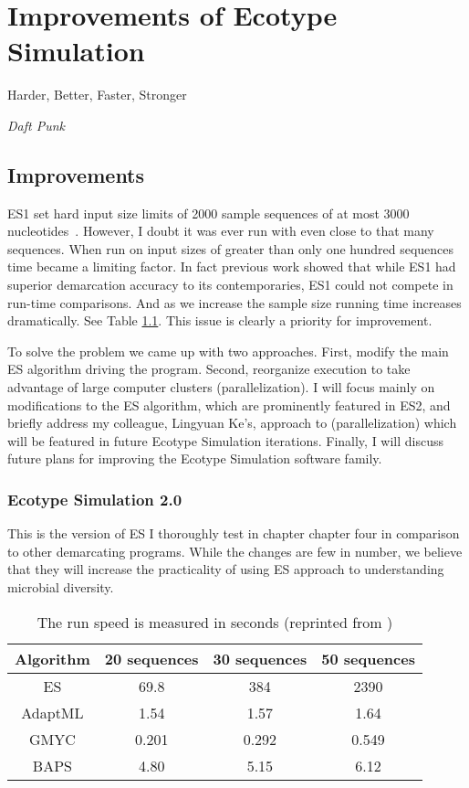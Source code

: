 \chapter{Improvements of Ecotype Simulation}

\begin{shadequote}
Harder, Better, Faster, Stronger \par\emph{Daft Punk}
\end{shadequote}

\section{Improvements}
ES1 set hard input size limits of 2000 sample sequences of at most 3000 nucleotides~\cite{koeppel2008identifying}.
However, I doubt it was ever run with even close to that many sequences.
When run on input sizes of greater than only one hundred sequences time became a limiting factor.
In fact previous work showed that while ES1 had superior demarcation accuracy to its contemporaries, ES1 could not compete in run-time comparisons.
And as we increase the sample size running time increases dramatically.
See Table \ref{tab:ES1speed}.
This issue is clearly a priority for improvement.

To solve the problem we came up with two approaches.
First, modify the main ES algorithm driving the program.
Second, reorganize execution to take advantage of large computer clusters (parallelization).
I will focus mainly on modifications to the ES algorithm, which are prominently featured in ES2, and briefly address my colleague, Lingyuan Ke's, approach to (parallelization) which will be featured in future Ecotype Simulation iterations.
Finally, I will discuss future plans for improving the Ecotype Simulation software family.


\subsection*{Ecotype Simulation 2.0}
This is the version of ES I thoroughly test in chapter chapter four in comparison to other demarcating programs.
While the changes are few in number, we believe that they will increase the practicality of using ES approach to understanding microbial diversity.

\begin{table}
 \begin{tabular}{| c | c | c | c |}
  \hline
  Algorithm & 20 sequences & 30 sequences & 50 sequences \\ \hline
  ES & 69.8 & 384 & 2390 \\
  AdaptML & 1.54 & 1.57 & 1.64 \\
  GMYC & 0.201 & 0.292 & 0.549 \\
  BAPS & 4.80 & 5.15 & 6.12 \\
  \hline
 \end{tabular}
 \caption[ES1 run-time compared to other demarcation programs.]{The run speed is measured in seconds (reprinted from \protect\cite{carlo})}
 \label{tab:ES1speed}
\end{table}

